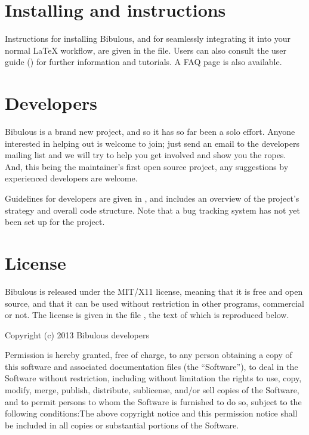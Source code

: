 \documentclass[letterpaper,10pt,english]{sphinxmanual}
\begin{document}
\section{Installing and instructions}
\label{README:installing-and-instructions}
Instructions for installing Bibulous, and for seamlessly integrating it into your normal LaTeX
workflow, are given in the  file. Users can also consult the user guide
() for further information and tutorials. A FAQ page is also available.


\section{Developers}
\label{README:developers}
Bibulous is a brand new project, and so it has so far been a solo effort. Anyone interested in
helping out is welcome to join; just send an email to the developers mailing list and we will try
to help you get involved and show you the ropes. And, this being the maintainer's first open
source project, any suggestions by experienced developers are welcome.

Guidelines for developers are given in , and includes an overview of the
project's strategy and overall code structure. Note that a bug tracking system has not yet been
set up for the project.


\section{License}
\label{README:license}
Bibulous is released under the MIT/X11 license, meaning that it is free and open source, and that
it can be used without restriction in other programs, commercial or not. The license is given in
the file , the text of which is reproduced below.

Copyright (c) 2013 Bibulous developers

Permission is hereby granted, free of charge, to any person obtaining a copy of this software and
associated documentation files (the ``Software''), to deal in the Software without restriction,
including without limitation the rights to use, copy, modify, merge, publish, distribute,
sublicense, and/or sell copies of the Software, and to permit persons to whom the Software is
furnished to do so, subject to the following conditions:The above copyright notice and this
permission notice shall be included in all copies or substantial portions of the Software.
\end{document}

